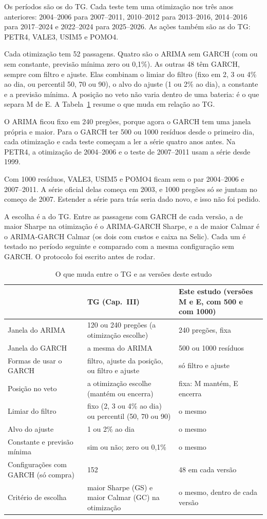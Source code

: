 \documentclass[11pt,a4paper]{article}
\begin{document}
Os períodos são os do TG. Cada teste tem uma otimização nos três anos anteriores: 2004--2006 para 2007--2011,
2010--2012 para 2013--2016, 2014--2016 para 2017--2024 e 2022--2024 para 2025--2026. As ações também são as
do TG: PETR4, VALE3, USIM5 e POMO4.

Cada otimização tem 52 passagens. Quatro são o ARIMA sem GARCH (com ou sem constante, previsão mínima zero ou
0,1\%). As outras 48 têm GARCH, sempre com filtro e ajuste. Elas combinam o limiar do filtro (fixo em 2, 3 ou
4\% ao dia, ou percentil 50, 70 ou 90), o alvo do ajuste (1 ou 2\% ao dia), a constante e a previsão mínima. A
posição no veto não varia dentro de uma bateria: é o que separa M de E. A Tabela~\ref{tab:montagem} resume o que
muda em relação ao TG.

O ARIMA ficou fixo em 240 pregões, porque agora o GARCH tem uma janela própria e maior. Para o GARCH ter 500 ou
1000 resíduos desde o primeiro dia, cada otimização e cada teste começam a ler a série quatro anos antes. Na
PETR4, a otimização de 2004--2006 e o teste de 2007--2011 usam a série desde 1999.

Com 1000 resíduos, VALE3, USIM5 e POMO4 ficam sem o par 2004--2006 e 2007--2011. A série oficial delas começa
em 2003, e 1000 pregões só se juntam no começo de 2007. Estender a série para trás seria dado novo, e isso não
foi pedido.

A escolha é a do TG. Entre as passagens com GARCH de cada versão, a de maior Sharpe na otimização é o
ARIMA-GARCH Sharpe, e a de maior Calmar é o ARIMA-GARCH Calmar (os dois com custos e caixa na Selic). Cada um é
testado no período seguinte e comparado com a mesma configuração sem GARCH. O protocolo foi escrito antes de
rodar.

\begin{table}[htbp]
\centering
\caption{O que muda entre o TG e as versões deste estudo}
\label{tab:montagem}
\small
\begin{tabular}{p{4.0cm}p{5.4cm}p{6.2cm}}
\toprule
 & TG (Cap.~III) & Este estudo (versões M e E, com 500 e com 1000) \\
\midrule
Janela do ARIMA & 120 ou 240 pregões (a otimização escolhe) & 240 pregões, fixa \\
Janela do GARCH & a mesma do ARIMA & 500 ou 1000 resíduos \\
Formas de usar o GARCH & filtro, ajuste da posição, ou filtro e ajuste & só filtro e ajuste \\
Posição no veto & a otimização escolhe (mantém ou encerra) & fixa: M mantém, E encerra \\
Limiar do filtro & fixo (2, 3 ou 4\% ao dia) ou percentil (50, 70 ou 90) & o mesmo \\
Alvo do ajuste & 1 ou 2\% ao dia & o mesmo \\
Constante e previsão mínima & sim ou não; zero ou 0,1\% & o mesmo \\
Configurações com GARCH (só compra) & 152 & 48 em cada versão \\
Critério de escolha & maior Sharpe (GS) e maior Calmar (GC) na otimização & o mesmo, dentro de cada versão \\
\bottomrule
\end{tabular}
\end{table}
\end{document}
